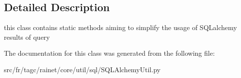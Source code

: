 \subsection{Detailed Description}
this class contains static methods aiming to simplify the usage of S\+Q\+Lalchemy results of query 

The documentation for this class was generated from the following file\+:\begin{DoxyCompactItemize}
\item 
src/fr/tagc/rainet/core/util/sql/S\+Q\+L\+Alchemy\+Util.\+py\end{DoxyCompactItemize}
